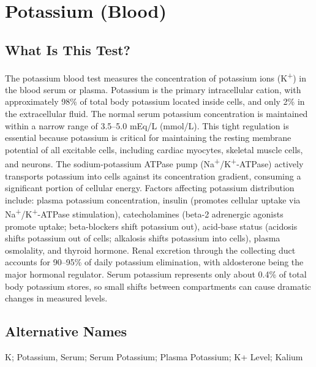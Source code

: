 \chapter{Potassium (Blood)}

\section*{What Is This Test?}
The potassium blood test measures the concentration of potassium ions (K\textsuperscript{+}) in the blood serum or plasma. Potassium is the primary intracellular cation, with approximately 98\% of total body potassium located inside cells, and only 2\% in the extracellular fluid. The normal serum potassium concentration is maintained within a narrow range of 3.5--5.0 mEq/L (mmol/L). This tight regulation is essential because potassium is critical for maintaining the resting membrane potential of all excitable cells, including cardiac myocytes, skeletal muscle cells, and neurons. The sodium-potassium ATPase pump (Na\textsuperscript{+}/K\textsuperscript{+}-ATPase) actively transports potassium into cells against its concentration gradient, consuming a significant portion of cellular energy. Factors affecting potassium distribution include: plasma potassium concentration, insulin (promotes cellular uptake via Na\textsuperscript{+}/K\textsuperscript{+}-ATPase stimulation), catecholamines (beta-2 adrenergic agonists promote uptake; beta-blockers shift potassium out), acid-base status (acidosis shifts potassium out of cells; alkalosis shifts potassium into cells), plasma osmolality, and thyroid hormone. Renal excretion through the collecting duct accounts for 90--95\% of daily potassium elimination, with aldosterone being the major hormonal regulator. Serum potassium represents only about 0.4\% of total body potassium stores, so small shifts between compartments can cause dramatic changes in measured levels.

\section*{Alternative Names}
K; Potassium, Serum; Serum Potassium; Plasma Potassium; K+ Level; Kalium

